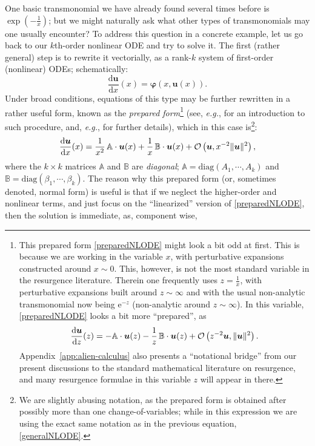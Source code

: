 \documentclass[11pt,a4paper]{article}
\newcommand{\CO}{{\cal O}}
\newcommand{\be}{\begin{equation}}
\newcommand{\ee}{\end{equation}}
\newcommand{\rme}{{\mathrm{e}}}
\newcommand{\rmd}{{\mathrm{d}}}
\begin{document}
One basic transmonomial we have already found several times before is $\exp \left( - \frac{1}{x} \right)$; but we might naturally ask what other types of transmonomials may one usually encounter? To address this question in a concrete example, let us go back to our $k$th-order nonlinear ODE and try to solve it. The first (rather general) step is to rewrite it vectorially, as a rank-$k$ system of first-order (nonlinear) ODEs; schematically:
%
\be
\label{generalNLODE}
\frac{\rmd \boldsymbol{u}}{\rmd x} (x) = \boldsymbol{\varphi} \left( x, \boldsymbol{u} (x) \right).
\ee
%
\noindent
Under broad conditions, equations of this type may be further rewritten in a rather useful form, known as the \textit{prepared form}\footnote{This prepared form \eqref{preparedNLODE} might look a bit odd at first. This is because we are working in the variable $x$, with perturbative expansions constructed around $x \sim 0$. This, however, is not the most standard variable in the  resurgence literature. Therein one frequently uses $z = \frac{1}{x}$, with perturbative expansions built around $z \sim \infty$ and with the usual non-analytic transmonomial now being $\rme^{-z}$ (non-analytic around $z \sim \infty$). In this variable, \eqref{preparedNLODE} looks a bit more ``prepared'', as
%
\be
\frac{\rmd \boldsymbol{u}}{\rmd z} (z) = - \mathbb{A} \cdot \boldsymbol{u} (z) - \frac{1}{z}\, \mathbb{B} \cdot \boldsymbol{u} (z) + \CO \left( z^{-2} \boldsymbol{u}, \| \boldsymbol{u} \|^2 \right).
\ee
%
\noindent
Appendix~\ref{app:alien-calculus} also presents a ``notational bridge'' from our present discussions to the standard mathematical literature on resurgence, and many resurgence formulae in this variable $z$ will appear in there.} (see, \textit{e.g.}, \cite{m10} for an introduction to such procedure, and, \textit{e.g.}, \cite{c95, c98} for further details), which in this case is\footnote{We are slightly abusing notation, as the prepared form is obtained after possibly more than one change-of-variables; while in this expression we are using the exact same notation as in the previous equation, \eqref{generalNLODE}.}:
%
\be
\label{preparedNLODE}
\frac{\rmd \boldsymbol{u}}{\rmd x} (x) = \frac{1}{x^2}\, \mathbb{A} \cdot \boldsymbol{u} (x) + \frac{1}{x}\, \mathbb{B} \cdot \boldsymbol{u} (x) + \CO \left( \boldsymbol{u}, x^{-2} \| \boldsymbol{u} \|^2 \right),
\ee
%
\noindent
where the $k \times k$ matrices $\mathbb{A}$ and $\mathbb{B}$ are \textit{diagonal}; $\mathbb{A} = \text{diag} \left( A_1, \cdots, A_k \right)$ and $\mathbb{B} = \text{diag} \left( \beta_1, \cdots, \beta_k \right)$. The reason why this prepared form (or, sometimes denoted, normal form) is useful is that if we neglect the higher-order and nonlinear terms, and just focus on the ``linearized'' version of \eqref{preparedNLODE}, then the solution is immediate, as, component wise,
\end{document}

